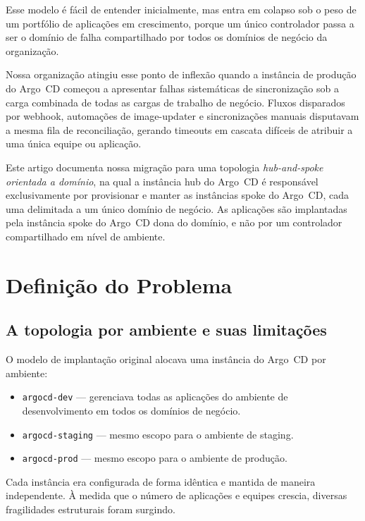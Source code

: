 \documentclass[11pt,a4paper]{article}
\begin{document}
Esse modelo é fácil de entender inicialmente, mas entra em colapso sob o peso de um
portfólio de aplicações em crescimento, porque um único controlador passa a ser o domínio
de falha compartilhado por todos os domínios de negócio da organização.

Nossa organização atingiu esse ponto de inflexão quando a instância de produção do
Argo~CD começou a apresentar falhas sistemáticas de sincronização sob a carga combinada
de todas as cargas de trabalho de negócio.
Fluxos disparados por webhook, automações de image-updater e sincronizações manuais
disputavam a mesma fila de reconciliação, gerando timeouts em cascata difíceis de
atribuir a uma única equipe ou aplicação.

Este artigo documenta nossa migração para uma topologia \emph{hub-and-spoke orientada a
domínio}, na qual a instância hub do Argo~CD é responsável exclusivamente por provisionar
e manter as instâncias spoke do Argo~CD, cada uma delimitada a um único domínio de
negócio.
As aplicações são implantadas pela instância spoke do Argo~CD dona do domínio, e não por
um controlador compartilhado em nível de ambiente.

\section{Definição do Problema}
\label{sec:problem}

\subsection{A topologia por ambiente e suas limitações}

O modelo de implantação original alocava uma instância do Argo~CD por ambiente:

\begin{itemize}[leftmargin=1.5em]
  \item \texttt{argocd-dev} --- gerenciava todas as aplicações do ambiente de
        desenvolvimento em todos os domínios de negócio.
  \item \texttt{argocd-staging} --- mesmo escopo para o ambiente de staging.
  \item \texttt{argocd-prod} --- mesmo escopo para o ambiente de produção.
\end{itemize}

Cada instância era configurada de forma idêntica e mantida de maneira independente.
À medida que o número de aplicações e equipes crescia, diversas fragilidades estruturais
foram surgindo.
\end{document}
